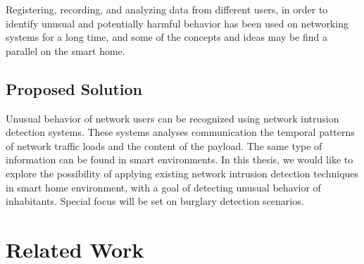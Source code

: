 Registering, recording, and analyzing data from different users, in order to identify unusual and potentially harmful behavior has been used on networking systems for a long time, and some of the concepts and ideas may be find a parallel on the smart home.

\subsection*{Proposed Solution}
Unusual behavior of network users can be recognized using network intrusion detection systems. These systems analyses communication the temporal patterns of network traffic loads and the content of the payload. The same type of information can be found in smart environments. In this thesis, we would like to explore the possibility of applying existing network intrusion detection techniques in smart home environment, with a goal of detecting unusual behavior of inhabitants. Special focus will be set on burglary detection scenarios.



\section{Related Work}
\label{related_work}

